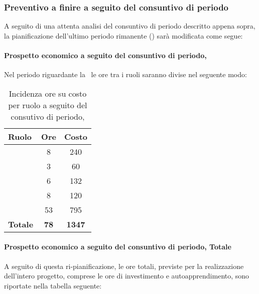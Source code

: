 \subsubsection{Preventivo a finire a seguito del consuntivo di periodo}
A seguito di una attenta analisi del consuntivo di periodo descritto appena sopra, la pianificazione dell'ultimo periodo rimanente (\VV) sarà modificata come segue:

\paragraph{Prospetto economico a seguito del consuntivo di periodo, \VV}
Nel periodo riguardante la \VV\ le ore tra i ruoli saranno divise nel seguente modo:
\begin{table}[h]
	\begin{center}
		\begin{tabular}{|l|c|c|}
			\hline
			\textbf{Ruolo}	& \textbf{Ore} &	\textbf{Costo}	 \\
			\hline
			\textit{\Pm}	&	8	&	240		\\
			\hline
			\textit{\Am}	&	3	&	60		\\ 
			\hline
			\textit{\Prog}	&	6	&	132	\\
			\hline
			\textit{\Progr}	&	8	&	120	\\ 
			\hline
			\textit{\Ver}	&	53	&	795	\\
			\hline
			\textbf{Totale}	&	\textbf{78}	&	\textbf{1347}	\\
			\hline
						
		\end{tabular}
	\end{center}
	\caption{Incidenza ore su costo per ruolo a seguito del consutivo di periodo, \VV}
\end{table}

\paragraph{Prospetto economico a seguito del consuntivo di periodo, Totale}
A seguito di questa ri-pianificazione, le ore totali, previste per la realizzazione dell'intero progetto, comprese le ore di investimento e autoapprendimento, sono riportate nella tabella seguente:

